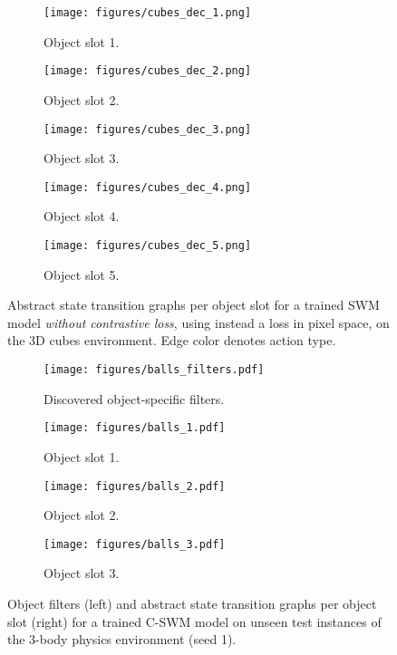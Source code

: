 \documentclass{article} %
\begin{document}
\begin{figure*}[htp]
\centering
  \begin{subfigure}[b]{0.18\textwidth}
  \centering
    \texttt{[image: figures/cubes\_dec\_1.png]}
    \caption{Object slot 1.}
  \end{subfigure}
  \begin{subfigure}[b]{0.18\textwidth}
  \centering
    \texttt{[image: figures/cubes\_dec\_2.png]}
    \caption{Object slot 2.}
  \end{subfigure}
  \begin{subfigure}[b]{0.18\textwidth}
  \centering
    \texttt{[image: figures/cubes\_dec\_3.png]}
    \caption{Object slot 3.}
  \end{subfigure}
  \begin{subfigure}[b]{0.18\textwidth}
  \centering
    \texttt{[image: figures/cubes\_dec\_4.png]}
    \caption{Object slot 4.}
  \end{subfigure}
  \begin{subfigure}[b]{0.18\textwidth}
  \centering
    \texttt{[image: figures/cubes\_dec\_5.png]}
    \caption{Object slot 5.}
  \end{subfigure}
  \caption{Abstract state transition graphs per object slot for a trained SWM model \textit{without contrastive loss}, using instead a loss in pixel space, on the 3D cubes environment. Edge color denotes action type.\label{fig:object_graphs_decoder}}
\end{figure*}

\begin{figure*}[htp]
\centering
  \begin{subfigure}[b]{0.38\textwidth}
  \centering
    \texttt{[image: figures/balls\_filters.pdf]}
    \caption{Discovered object-specific filters.}
  \end{subfigure}
  \begin{subfigure}[b]{0.18\textwidth}
  \centering
    \texttt{[image: figures/balls\_1.pdf]}
    \caption{Object slot 1.}
  \end{subfigure}
  \begin{subfigure}[b]{0.18\textwidth}
  \centering
    \texttt{[image: figures/balls\_2.pdf]}
    \caption{Object slot 2.}
  \end{subfigure}
  \begin{subfigure}[b]{0.18\textwidth}
  \centering
    \texttt{[image: figures/balls\_3.pdf]}
    \caption{Object slot 3.}
  \end{subfigure}
  \caption{Object filters (left) and abstract state transition graphs per object slot (right) for a trained C-SWM model on unseen test instances of the 3-body physics environment (seed 1).\label{fig:object_graphs_physics}}
\end{figure*}
\end{document}
